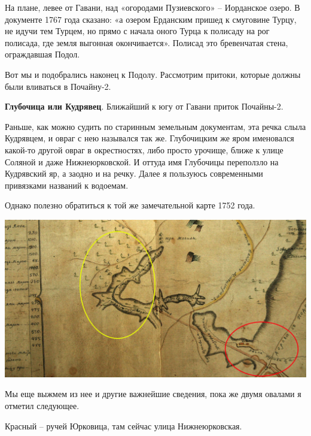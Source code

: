 На плане, левее от Гавани, над «огородами Пузиевского» – Иорданское озеро. В документе 1767 года сказано: «а озером Ерданским пришед к смуговине Турцу, не идучи тем Турцем, но прямо с начала оного Турца к полисаду на рог полисада, где земля выгонная окончивается». Полисад это бревенчатая стена, ограждавшая Подол.



Вот мы и подобрались наконец к Подолу. Рассмотрим притоки, которые должны были вливаться в Почайну-2.

\textbf{Глубочица или Кудрявец}. Ближайший к югу от Гавани приток Почай\-ны-2.

Раньше, как можно судить по старинным земельным документам, эта речка слыла Кудрявцем, и овраг с нею назывался так же. Глубочицким же яром именовался какой-то другой овраг в окрестностях, либо просто урочище, ближе к улице Соляной и даже Нижнеюрковской. И оттуда имя Глубочицы переползло на Кудрявский яр, а заодно и на речку. Далее я пользуюсь современными привязками названий к водоемам.

Однако полезно обратиться к той же замечательной карте 1752 года.

\begin{center}
\includegraphics[width=\linewidth]{chast-colebanie-osnov/pochayna/kudr.jpg}
\end{center}

Мы еще выжмем из нее и другие важнейшие сведения, пока же двумя овалами я отметил следующее.

Красный – ручей Юрковица, там сейчас улица Нижнеюрковская.

